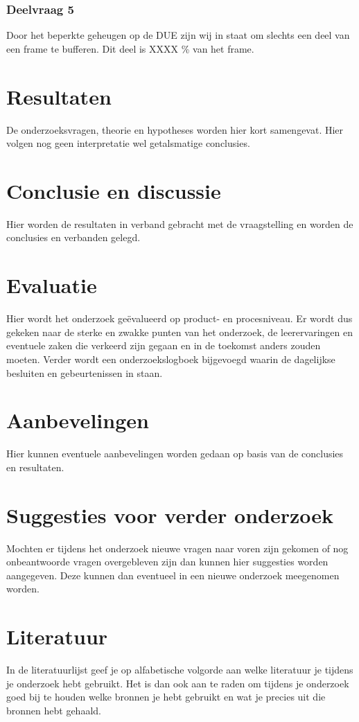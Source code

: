 \documentclass{article}
\begin{document}
\subsubsection{Deelvraag 5}
Door het beperkte geheugen op de DUE zijn wij in staat om slechts een deel van een frame te bufferen. Dit deel is XXXX \% van het frame.

\section{Resultaten}
De onderzoeksvragen, theorie en hypotheses worden hier kort samengevat. Hier volgen nog geen interpretatie wel getalsmatige conclusies.

\section{Conclusie en discussie}
Hier worden de resultaten in verband gebracht met de vraagstelling en worden de conclusies en verbanden gelegd.

\section{Evaluatie}
Hier wordt het onderzoek geëvalueerd op product- en procesniveau. Er wordt dus gekeken naar de sterke en zwakke punten van het onderzoek, de leerervaringen en eventuele zaken die verkeerd zijn gegaan en in de toekomst anders zouden moeten. Verder wordt een onderzoekslogboek bijgevoegd waarin de dagelijkse besluiten en gebeurtenissen in staan.

\section{Aanbevelingen}
Hier kunnen eventuele aanbevelingen worden gedaan op basis van de conclusies en resultaten.

\section{Suggesties voor verder onderzoek}
Mochten er tijdens het onderzoek nieuwe vragen naar voren zijn gekomen of nog onbeantwoorde vragen overgebleven zijn dan kunnen hier suggesties worden aangegeven. Deze kunnen dan eventueel in een nieuwe onderzoek meegenomen worden.

\section{Literatuur}
In de literatuurlijst geef je op alfabetische volgorde aan welke literatuur je tijdens je onderzoek hebt gebruikt. Het is dan ook aan te raden om tijdens je onderzoek goed bij te houden welke bronnen je hebt gebruikt en wat je precies uit die bronnen hebt gehaald.
\end{document}
